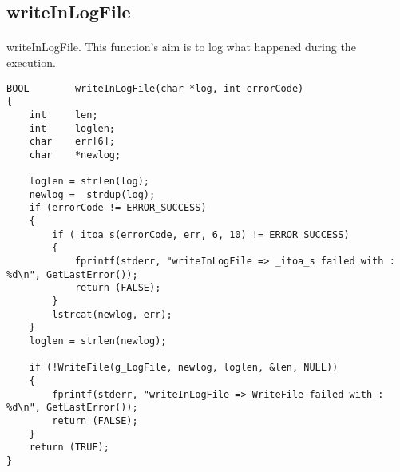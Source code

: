 \documentclass{article}
\begin{document}

\newpage
\subsection{writeInLogFile}
\paragraph{}
writeInLogFile. This function's aim is to log what happened during the execution.

\begin{lstlisting}
BOOL		writeInLogFile(char *log, int errorCode)
{
	int		len;
	int		loglen;
	char	err[6];
	char	*newlog;

	loglen = strlen(log);
	newlog = _strdup(log);
	if (errorCode != ERROR_SUCCESS)
	{
		if (_itoa_s(errorCode, err, 6, 10) != ERROR_SUCCESS)
		{
			fprintf(stderr, "writeInLogFile => _itoa_s failed with : %d\n", GetLastError());
			return (FALSE);
		}
		lstrcat(newlog, err);
	}
	loglen = strlen(newlog);

	if (!WriteFile(g_LogFile, newlog, loglen, &len, NULL))
	{
		fprintf(stderr, "writeInLogFile => WriteFile failed with : %d\n", GetLastError());
		return (FALSE);
	}
	return (TRUE);
}
\end{lstlisting}

\restoregeometry
\end{document}
